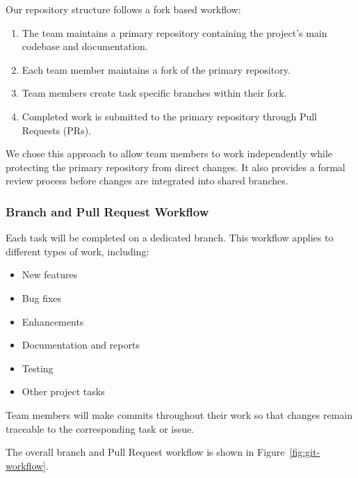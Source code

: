 \documentclass{article}
\begin{document}
Our repository structure follows a fork based workflow:

\begin{enumerate}
    \item The team maintains a primary repository containing the project's
    main codebase and documentation.

    \item Each team member maintains a fork of the primary repository.

    \item Team members create task specific branches within their fork.

    \item Completed work is submitted to the primary repository through
    Pull Requests (PRs).
\end{enumerate}

We chose this approach to allow team members to work independently while
protecting the primary repository from direct changes. It also provides a
formal review process before changes are integrated into shared branches.


\subsubsection{Branch and Pull Request Workflow}

Each task will be completed on a dedicated branch. This workflow applies to
different types of work, including:

\begin{itemize}
    \item New features
    \item Bug fixes
    \item Enhancements
    \item Documentation and reports
    \item Testing
    \item Other project tasks
\end{itemize}

Team members will make commits throughout their work so that changes remain
traceable to the corresponding task or issue.

The overall branch and Pull Request workflow is shown in
Figure~\ref{fig:git-workflow}.
\end{document}
